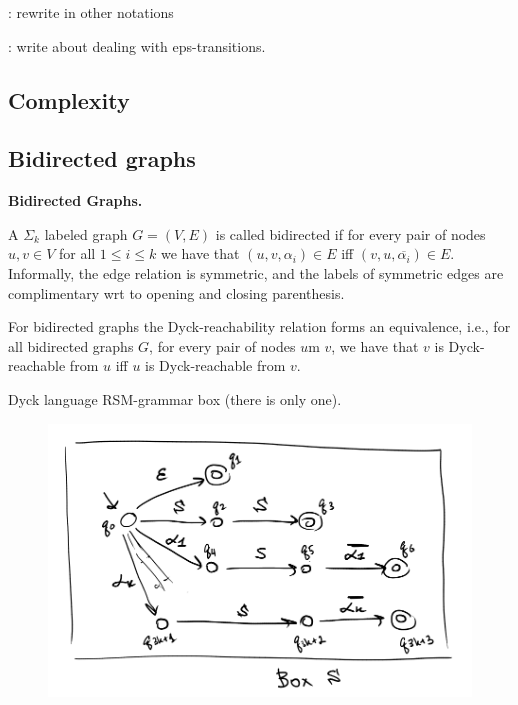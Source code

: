 {\color{red}{TODO}}: rewrite in other notations

{\color{red}{TODO}}: write about dealing with eps-transitions.

\subsection{Complexity}

{\color{red}{TODO}}

\subsection{Bidirected graphs}

\begin{definition}

{\bf Bidirected Graphs.}

A $\Sigma_k$ labeled graph $G = (V, E)$ is called bidirected if for every pair of nodes $u, v \in V$ for all $1 \le i \le k$ we have that $(u, v, \alpha_i) \in E$ iff $(v, u, \overline{\alpha_i}) \in E$. 
Informally, the edge relation is symmetric, and the labels of symmetric edges are complimentary wrt to opening and closing parenthesis. 
\end{definition}

\begin{remark} \label{r1}
    For bidirected graphs the Dyck-reachability relation forms an equivalence, i.e., for all bidirected graphs $G$, for every pair of nodes $u$m $v$, we have that $v$ is Dyck-reachable from $u$ iff $u$ is Dyck-reachable from $v$.
\end{remark}

\begin{note}
    Dyck language RSM-grammar box (there is only one).
    
    \begin{figure}[H]
        \includegraphics[width=\linewidth]{img/dyck_box.png}
    \end{figure}
\end{note}


